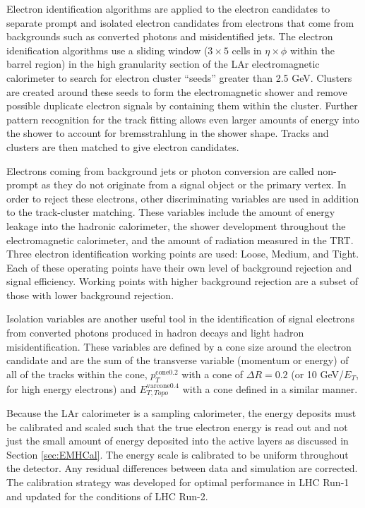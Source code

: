 Electron identification algorithms are applied to the electron candidates to separate prompt and isolated electron candidates from electrons that come from backgrounds such as converted photons and misidentified jets.  The electron idenification algorithms use a sliding window ($3\times5$ cells in $\eta \times \phi$ within the barrel region) in the high granularity section of the LAr electromagnetic calorimeter to search for electron cluster ``seeds'' greater than 2.5 GeV.  Clusters are created around these seeds to form the electromagnetic shower and remove possible duplicate electron signals by containing them within the cluster.  Further pattern recognition for the track fitting allows even larger amounts of energy into the shower to account for bremsstrahlung in the shower shape.  Tracks and clusters are then matched to give electron candidates.  

Electrons coming from background jets or photon conversion are called non-prompt as they do not originate from a signal object or the primary vertex.  In order to reject these electrons, other discriminating variables are used in addition to the track-cluster matching.  These variables include the amount of energy leakage into the hadronic calorimeter, the shower development throughout the electromagnetic calorimeter, and the amount of radiation measured in the TRT.  Three electron identification working points are used: Loose, Medium, and Tight.  Each of these operating points have their own level of background rejection and signal efficiency.  Working points with higher background rejection are a subset of those with lower background rejection.

Isolation variables are another useful tool in the identification of signal electrons from converted photons produced in hadron decays and light hadron misidentification.  These variables are defined by a cone size around the electron candidate and are the sum of the transverse variable (momentum or energy) of all of the tracks within the cone, $p_{T}^{\text{cone0.2}}$ with a cone of $\Delta R =0.2$ (or 10 GeV/$E_T$, for high energy electrons) and $E_{T, Topo}^{\text{varcone0.4}}$ with a cone defined in a similar manner.  

Because the LAr calorimeter is a sampling calorimeter, the energy deposits must be calibrated and scaled such that the true electron energy is read out and not just the small amount of energy deposited into the active layers as discussed in Section \ref{sec:EMHCal}.  The energy scale is calibrated to be uniform throughout the detector.  Any residual differences between data and simulation are corrected.  The calibration strategy was developed for optimal performance in LHC Run-1\cite{ElectronCalib1} and updated for the conditions of LHC Run-2\cite{ElectronCalib2}.

